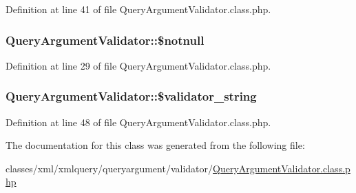 Definition at line 41 of file Query\-Argument\-Validator.\-class.\-php.

\hypertarget{classQueryArgumentValidator_a45e9ab83bacc4f0895f05faa3aeac81c}{
\subsubsection[{\$notnull}]{\setlength{\rightskip}{0pt plus 5cm}Query\-Argument\-Validator\-::\$notnull}}\label{classQueryArgumentValidator_a45e9ab83bacc4f0895f05faa3aeac81c}


Definition at line 29 of file Query\-Argument\-Validator.\-class.\-php.

\hypertarget{classQueryArgumentValidator_aa06a359be9617e979f903ae78537ad79}{
\subsubsection[{\$validator\-\_\-string}]{\setlength{\rightskip}{0pt plus 5cm}Query\-Argument\-Validator\-::\$validator\-\_\-string}}\label{classQueryArgumentValidator_aa06a359be9617e979f903ae78537ad79}


Definition at line 48 of file Query\-Argument\-Validator.\-class.\-php.



The documentation for this class was generated from the following file\-:\begin{DoxyCompactItemize}
\item 
classes/xml/xmlquery/queryargument/validator/\hyperlink{QueryArgumentValidator_8class_8php}{Query\-Argument\-Validator.\-class.\-php}\end{DoxyCompactItemize}
